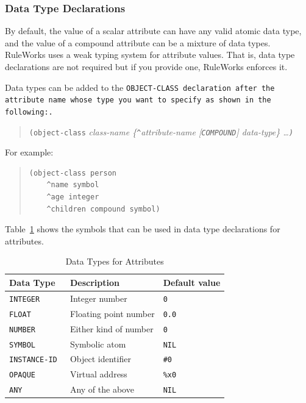 \subsubsection{Data Type Declarations}

By default, the value of a scalar attribute can have any
valid atomic data type, and the value of a compound attribute
can be a mixture of data types. RuleWorks uses a weak typing
system for attribute values. That is, data type declarations
are not required but if you provide one, RuleWorks enforces
it.

Data types can be added to the \tt{OBJECT-CLASS} declaration after
the attribute name whose type you want to specify as shown in
the following:.

\begin{quote}
  \verb|(object-class| \it{class-name} \{\verb|^|\it{attribute-name}
    [\verb|COMPOUND|] \it{data-type}\} \ldots \verb|)|
\end{quote}

For example:

\begin{quote}
\begin{verbatim}
(object-class person
    ^name symbol
    ^age integer
    ^children compound symbol)
\end{verbatim}
\end{quote}

Table~\ref{t:2-2} shows the symbols that can be used in data type
declarations for attributes.

\begin{table}[h]
  \centering
  \begin{tabular}{lll}
    \toprule
    Data Type & Description & Default value \\
    \midrule
    \tt{INTEGER}     & Integer number        & \tt{0} \\
    \tt{FLOAT}       & Floating point number & \tt{0.0} \\
    \tt{NUMBER}      & Either kind of number & \tt{0} \\
    \tt{SYMBOL}      & Symbolic atom         & \tt{NIL} \\
    \tt{INSTANCE-ID} & Object identifier     & \verb|#0| \\
    \tt{OPAQUE}      & Virtual address       & \verb|%x0| \\
    \tt{ANY}         & Any of the above      & \tt{NIL} \\  
    \bottomrule
  \end{tabular}
  \caption{Data Types for Attributes}
  \label{t:2-2}
\end{table}

